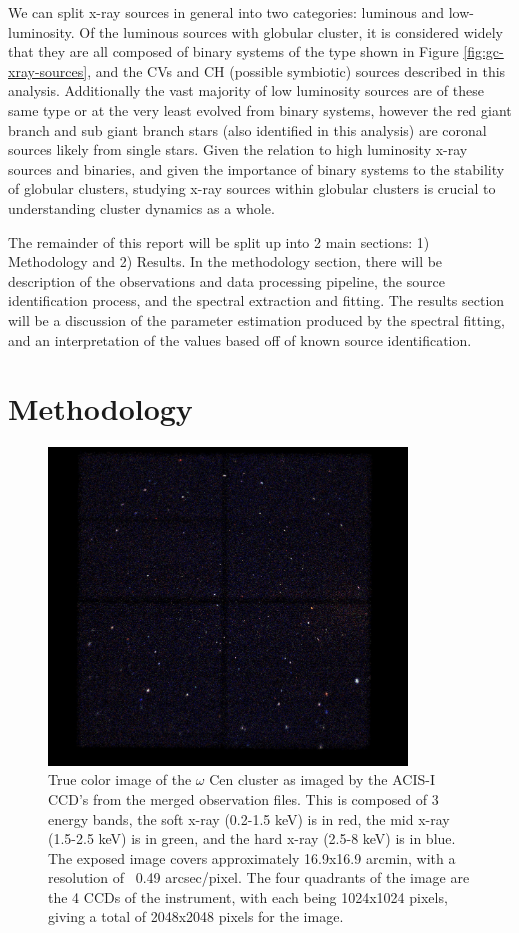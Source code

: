 \documentclass[aps,
                pra,  
                a4paper, 
                amsmath, 
                amssymb, 
                preprint,
                tightenlines,  
                amsfonts,
                nofootinbib,
                notitlepage
            ]{revtex4-2}
\begin{document}
We can split x-ray sources in general into two categories: luminous and low-luminosity. Of the luminous sources with globular cluster, it is considered widely that they are all composed of binary systems of the type shown in Figure \ref{fig:gc-xray-sources}, and the CVs and CH (possible symbiotic) sources described in this analysis. Additionally the vast majority of low luminosity sources are of these same type or at the very least evolved from binary systems, however the red giant branch and sub giant branch stars (also identified in this analysis) are coronal sources likely from single stars. Given the relation to high luminosity x-ray sources and binaries, and given the importance of binary systems to the stability of globular clusters, studying x-ray sources within globular clusters is crucial to understanding cluster dynamics as a whole. 
\par
The remainder of this report will be split up into 2 main sections: 1) Methodology and 2) Results. In the methodology section, there will be description of the observations and data processing pipeline, the source identification process, and the spectral extraction and fitting. The results section will be a discussion of the parameter estimation produced by the spectral fitting, and an interpretation of the values based off of known source identification.  

\section{Methodology}
\begin{figure}
    \centering
    \includegraphics[width=0.85\textwidth]{img/truecolor-mx0.75-edit-bright.jpg}
    \caption{True color image of the $\omega$ Cen cluster as imaged by the ACIS-I CCD's from the merged observation files. This is composed of 3 energy bands, the soft x-ray (0.2-1.5 keV) is in red, the mid x-ray (1.5-2.5 keV) is in green, and the hard x-ray (2.5-8 keV) is in blue. The exposed image covers approximately 16.9x16.9 arcmin, with a resolution of ~0.49 arcsec/pixel. The four quadrants of the image are the 4 CCDs of the instrument, with each being 1024x1024 pixels, giving a total of 2048x2048 pixels for the image.}
    \label{fig:truecolor-picture}
\end{figure}
\end{document}
